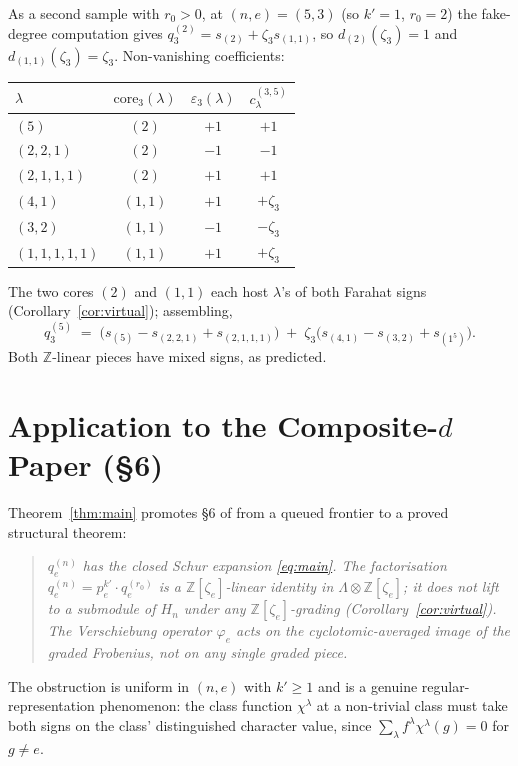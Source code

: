 \documentclass[11pt]{article}
\theoremstyle{definition}
\theoremstyle{remark}
\newcommand{\qen}{q_e^{(n)}}
\newcommand{\qer}{q_e^{(r_0)}}
\newcommand{\zetae}{\zeta_e}
\newcommand{\ZZ}{\mathbb{Z}}
\newcommand{\core}{\mathrm{core}}
\newcommand{\Lam}{\Lambda}
\begin{document}
\smallskip
As a second sample with $r_0>0$, at $(n,e)=(5,3)$ (so $k'=1$, $r_0=2$)
the fake-degree computation gives
$q_3^{(2)}=s_{(2)}+\zeta_3 s_{(1,1)}$, so
$d_{(2)}(\zeta_3)=1$ and $d_{(1,1)}(\zeta_3)=\zeta_3$. Non-vanishing coefficients:
\begin{center}
\begin{tabular}{lccc}
\hline
$\lambda$ & $\core_3(\lambda)$ & $\varepsilon_3(\lambda)$ & $c_\lambda^{(3,5)}$ \\
\hline
$(5)$ & $(2)$ & $+1$ & $+1$ \\
$(2,2,1)$ & $(2)$ & $-1$ & $-1$ \\
$(2,1,1,1)$ & $(2)$ & $+1$ & $+1$ \\
$(4,1)$ & $(1,1)$ & $+1$ & $+\zeta_3$ \\
$(3,2)$ & $(1,1)$ & $-1$ & $-\zeta_3$ \\
$(1,1,1,1,1)$ & $(1,1)$ & $+1$ & $+\zeta_3$ \\
\hline
\end{tabular}
\end{center}
The two cores $(2)$ and $(1,1)$ each host $\lambda$'s of both Farahat signs
(Corollary~\ref{cor:virtual}); assembling,
\[
  q_3^{(5)} \;=\; \bigl(s_{(5)}-s_{(2,2,1)}+s_{(2,1,1,1)}\bigr)\;+\;
  \zeta_3\bigl(s_{(4,1)}-s_{(3,2)}+s_{(1^5)}\bigr).
\]
Both $\ZZ$-linear pieces have mixed signs, as predicted.

\section{Application to the Composite-$d$ Paper (\S 6)}
\label{sec:composite-d}

Theorem~\ref{thm:main} promotes \S 6 of \cite{Cli26b} from a queued frontier
to a proved structural theorem:

\begin{quote}
\emph{$\qen$ has the closed Schur expansion \eqref{eq:main}. The
factorisation $\qen=p_e^{k'}\cdot\qer$ is a $\ZZ[\zetae]$-linear identity in
$\Lam\otimes\ZZ[\zetae]$; it does not lift to a submodule of $H_n$ under
any $\ZZ[\zetae]$-grading (Corollary~\ref{cor:virtual}). The Verschiebung
operator $\varphi_e$ acts on the cyclotomic-averaged image of the graded
Frobenius, not on any single graded piece.}
\end{quote}

The obstruction is uniform in $(n,e)$ with $k'\ge 1$ and is a genuine
regular-representation phenomenon: the class function $\chi^\lambda$ at a
non-trivial class must take both signs on the class' distinguished character
value, since $\sum_\lambda f^\lambda \chi^\lambda(g)=0$ for $g\ne e$.
\end{document}
